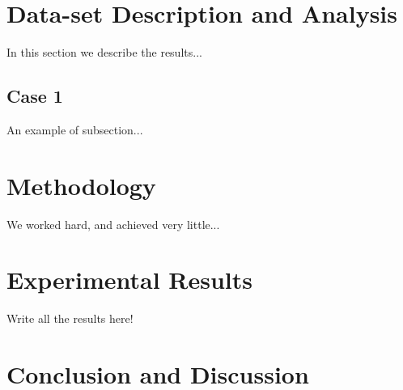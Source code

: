 \documentclass[10pt]{article}
\begin{document}

\section{Data-set Description and Analysis}\label{sec:3}
In this section we describe the results...

\subsection{Case 1}
An example of subsection...

\section{Methodology}\label{sec:4}
We worked hard, and achieved very little...

\newpage

\section{Experimental Results}\label{sec:5}

Write all the results here!

\section{Conclusion and Discussion}\label{sec:6}


\end{document}
